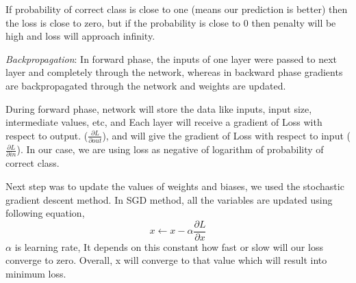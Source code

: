 \documentclass[conference]{IEEEtran}
\begin{document}
If probability of correct class is close to one (means our prediction is better) then the loss is close to zero, but if the probability is close to 0 then penalty will be high and loss will approach infinity.




\emph{Backpropagation}\cite{CNNPart2_VZ_2020}: In forward phase, the inputs of one layer were passed to next layer and completely through the network, whereas in backward phase gradients are backpropagated through the network and weights are updated.

During forward phase, network will store the data like inputs, input size, intermediate values, etc,
and Each layer will receive a gradient of Loss with respect to output. ($\frac{\partial L}{\partial out}$), and will give the gradient of Loss with respect to input ($\frac{\partial L}{\partial in}$). In our case, we are using loss as negative of logarithm of probability of correct class. 

Next step was to update the values of weights and biases, we used the stochastic gradient descent method. In SGD method, all the variables are updated using following equation,
\begin{equation}
x  \longleftarrow x -\alpha \frac{\partial L}{\partial x}
\end{equation}
$\alpha$ is learning rate, It depends on this constant how fast or slow will our loss converge to zero. Overall, x will converge to that value which will result into minimum loss.
\end{document}
